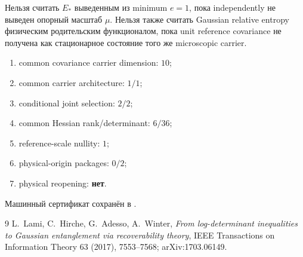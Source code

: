 \begin{nogocriterion}
Нельзя считать $E_*$ выведенным из minimum $e=1$, пока independently не
выведен опорный масштаб $\mu$. Нельзя также считать Gaussian relative
entropy физическим родительским функционалом, пока unit reference covariance не получена как
стационарное состояние того же microscopic carrier.
\end{nogocriterion}

\begin{protocol}\begin{enumerate}
\item common covariance carrier dimension: \textbf{$10$};
\item common carrier architecture: \textbf{$1/1$};
\item conditional joint selection: \textbf{$2/2$};
\item common Hessian rank/determinant: \textbf{$6/36$};
\item reference-scale nullity: \textbf{$1$};
\item physical-origin packages: \textbf{$0/2$};
\item physical reopening: \textbf{нет}.
\end{enumerate}\end{protocol}

Машинный сертификат сохранён в
.

\begin{thebibliography}{9}
L.~Lami, C.~Hirche, G.~Adesso, A.~Winter,
\emph{From log-determinant inequalities to Gaussian entanglement via
recoverability theory}, IEEE Transactions on Information Theory 63 (2017),
7553--7568; arXiv:1703.06149.
\end{thebibliography}